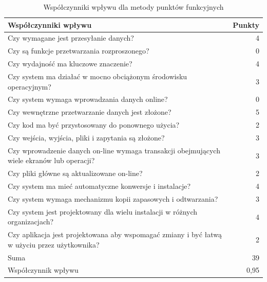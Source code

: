 \documentclass{mwrep}
\begin{document}
\begin{table}
    \begin{center}
        \begin{tabular}{|p{10cm}|r|} \hline
        \multicolumn{1}{|m{10cm}|}{\centering Współczynniki wpływu }                                           &
        \multicolumn{1}{m{2cm}|}{\centering Punkty}                                                            \\ \hline

        Czy wymagane jest przesyłanie danych?                                                           & 4    \\
        Czy są funkcje przetwarzania rozproszonego?                                                     & 0    \\
        Czy wydajność ma kluczowe znaczenie?                                                            & 4    \\
        Czy system ma działać w mocno obciążonym środowisku operacyjnym?                                & 3    \\
        Czy system wymaga wprowadzania danych online?                                                   & 0    \\
        Czy wewnętrzne przetwarzanie danych jest złożone?                                               & 5    \\
        Czy kod ma być przystosowany do ponownego użycia?                                               & 2    \\
        Czy wejścia, wyjścia, pliki i zapytania są złożone?                                             & 3    \\
        Czy wprowadzenie danych on-line wymaga transakcji obejmujących wiele ekranów lub operacji?      & 3    \\
        Czy pliki główne są aktualizowane  on-line?                                                     & 2    \\
        Czy system ma mieć automatyczne konwersje i instalacje?                                         & 4    \\
        Czy system wymaga mechanizmu kopii zapasowych i odtwarzania?                                    & 3    \\
        Czy system jest projektowany dla wielu instalacji w różnych organizacjach?                      & 4    \\
        Czy aplikacja jest projektowana aby wspomagać zmiany i być łatwą w użyciu przez użytkownika?    & 2    \\ \hline
        \hfill Suma                                                                                     & 39   \\ \hline
        \hfill Współczynnik wpływu                                                                      & 0,95 \\ \hline

        \end{tabular}
    \end{center}
    \caption{Współczynniki wpływu dla metody punktów funkcyjnych}
\end{table}
\end{document}
